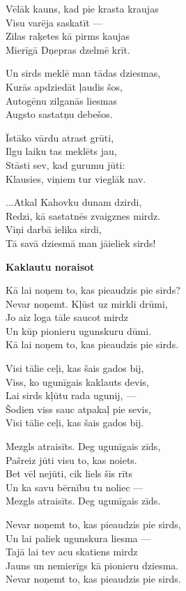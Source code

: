 \documentclass[11pt]{article}
\begin{document}
Vēlāk kauns, kad pie krasta kraujas\\
Visu varēja saskatīt ---\\
Zilas raķetes kā pirms kaujas\\
Mierīgā Dņepras dzelmē krīt.

Un sirds meklē man tādas dziesmas,\\
Kurās apdziedāt ļaudis šos,\\
Autogēnu zilganās liesmas\\
Augsto sastatņu debešos.

Īstāko vārdu atrast grūti,\\
Ilgu laiku tas meklēts jau,\\
Stāsti sev, kad gurumu jūti:\\
Klausies, viņiem tur vieglāk nav.

...Atkal Kahovku dunam dzirdi,\\
Redzi, kā sastatnēs zvaigznes mirdz.\\
Viņi darbā ielika sirdi,\\
Tā savā dziesmā man jāieliek sirds!

\newpage

{\bf Kaklautu noraisot}

Kā lai noņem to, kas pieaudzis pie sirds?\\
Nevar noņemt. Kļūst uz mirkli drūmi,\\
Jo aiz loga tāle saucot mirdz\\
Un kūp pionieru ugunskuru dūmi.\\
Kā lai noņem to, kas pieaudzis pie sirds.

Visi tālie ceļi, kas šais gados bij,\\
Viss, ko ugunīgais kaklauts devis,\\
Lai sirds kļūtu rada ugunij, ---\\
Šodien viss sauc atpakaļ pie sevis,\\
Visi tālie ceļi, kas šais gados bij.

Mezgls atraisīts. Deg ugunīgais zīds,\\
Pašreiz jūti visu to, kas noiets.\\
Bet vēl nejūti, cik liels šis rīts\\
Un ka savu bērnību tu noliec ---\\
Mezgls atraisīts. Deg ugunīgais zīds.

Nevar noņemt to, kas pieaudzis pie sirds,\\
Un lai paliek ugunskura liesma ---\\
Tajā lai tev acu skatiens mirdz\\
Jauns un nemierīgs kā pionieru dziesma.\\
Nevar noņemt to, kas pieaudzis pie sirds.
\end{document}
